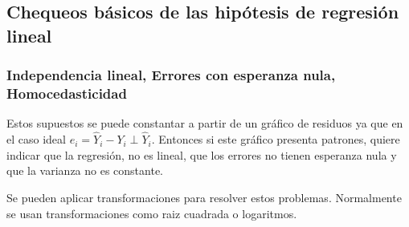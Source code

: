 \documentclass[
  12pt,
]{book}
\theoremstyle{definition}
\theoremstyle{definition}
\theoremstyle{definition}
\theoremstyle{remark}
\begin{document}
\hypertarget{chequeos-buxe1sicos-de-las-hipuxf3tesis-de-regresiuxf3n-lineal}{%
\subsection{Chequeos básicos de las hipótesis de regresión lineal}\label{chequeos-buxe1sicos-de-las-hipuxf3tesis-de-regresiuxf3n-lineal}}

\hypertarget{independencia-lineal-errores-con-esperanza-nula-homocedasticidad}{%
\subsubsection{Independencia lineal, Errores con esperanza nula, Homocedasticidad}\label{independencia-lineal-errores-con-esperanza-nula-homocedasticidad}}

Estos supuestos se puede constantar a partir de un gráfico de residuos ya que en el caso ideal \(e_{i} = \hat{Y}_{i}- Y_{i} \perp \hat{Y}_{i}\). Entonces si este gráfico presenta patrones, quiere indicar que la regresión, no es lineal, que los errores no tienen esperanza nula y que la varianza no es constante.

Se pueden aplicar transformaciones para resolver estos problemas. Normalmente se usan transformaciones como raiz cuadrada o logaritmos.
\end{document}
